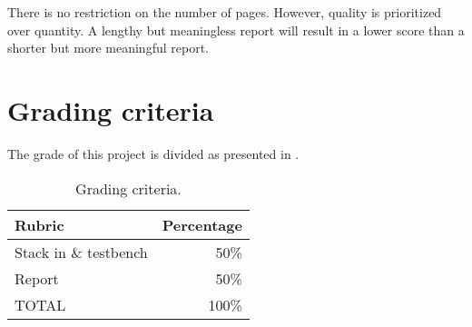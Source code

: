 \documentclass[number=03]{assignment}
\begin{document}
 There is no restriction on the number of pages. 
However, quality is prioritized over quantity. 
A lengthy but meaningless report will result in a lower score than a shorter but more meaningful report.

\section{Grading criteria}\label{sec:Grading}
The grade of this project is divided as presented in .
  \begin{table}[!htb]
    \centering
	\caption{Grading criteria.}
	\label{Table:Grading}
	\begin{tabular}{l|r}
	\hline
	  Rubric & Percentage \\
	  \hline\hline
	  Stack in \SV  \& testbench & 50\% \\\hline
	  Report                     & 50\% \\\hline\hline
	  TOTAL                      & 100\% \\  
	\end{tabular}
  \end{table}
 
\end{document}
